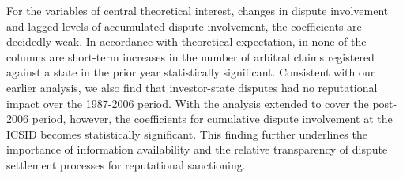 \documentclass[12pt,onesided]{amsart}
\begin{document}
For the variables of central theoretical interest, changes in dispute involvement and lagged levels of accumulated dispute involvement, the coefficients are decidedly weak. In accordance with theoretical expectation, in none of the columns are short-term increases in the number of arbitral claims registered against a state in the prior year statistically significant. Consistent with our earlier analysis, we also find that investor-state disputes had no reputational impact over the 1987-2006 period. With the analysis extended to cover the post-2006 period, however, the coefficients for cumulative dispute involvement at the ICSID becomes statistically significant. This finding further underlines the importance of information availability and the relative transparency of dispute settlement processes for reputational sanctioning. 
\end{document}
